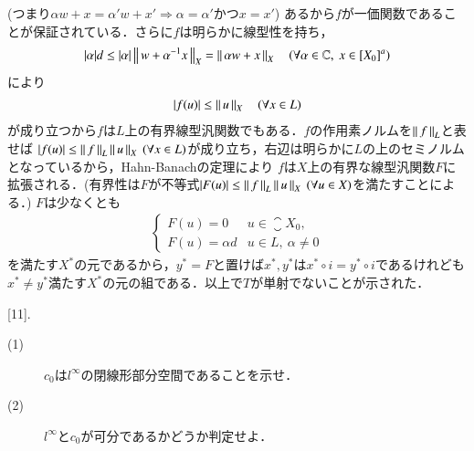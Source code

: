 \begin{prf}
\begin{description}
		(つまり$\alpha w + x = \alpha' w + x' \Rightarrow \alpha = \alpha'$かつ$x = x'$)
		あるから$f$が一価関数であることが保証されている．さらに$f$は明らかに線型性を持ち，
		\begin{align}
			|\alpha| d \leq |\alpha| \left\|\, w + \alpha^{-1}x\, \right\|_{X} = \left\|\, \alpha w + x\, \right\|_{X} \quad \left( \forall \alpha \in \mathbb{C},\ x \in \left[X_0\right]^a \right)
		\end{align}
		により
		\begin{align}
			|f(u)| \leq \left\|\, u\, \right\|_{X} \quad (\forall x \in L) \label{eq:func_analy_Q10_3}
		\end{align}
		が成り立つから$f$は$L$上の有界線型汎関数でもある．$f$の作用素ノルムを$\left\|\, f\, \right\|_{L}$と表せば
		$|f(u)| \leq \left\|\, f\, \right\|_{L} \left\|\, u\, \right\|_{X}\ (\forall x \in L)$が成り立ち，右辺は明らかに$L$の上のセミノルムとなっているから，Hahn-Banachの定理により
		$f$は$X$上の有界な線型汎関数$F$に拡張される．(有界性は$F$が不等式$|F(u)| \leq \left\|\, f\, \right\|_{L} \left\|\, u\, \right\|_{X}\ (\forall u \in X)$を満たすことによる．)
		$F$は少なくとも
		\begin{align}
			\begin{cases}
				F(u) = 0 & u \in \closure{X_0}, \\
				F(u) = \alpha d & u \in L,\ \alpha \neq 0
			\end{cases}
		\end{align}
		を満たす$X^*$の元であるから，$y^* = F$と置けば$x^*, y^*$は$x^* \circ i = y^* \circ i$であるけれども
		$x^* \neq y^*$満たす$X^*$の元の組である．以上で$T$が単射でないことが示された．
		\QED
\end{description}
\end{prf}

[11].\ 
	\begin{description}
		\item[(1)] $c_0$は$l^{\infty}$の閉線形部分空間であることを示せ．
		\item[(2)] $l^{\infty}$と$c_0$が可分であるかどうか判定せよ．
	\end{description}
	
